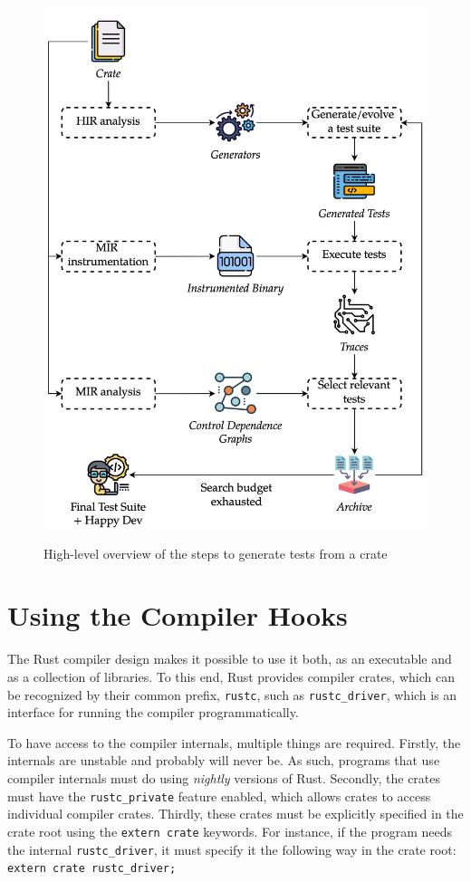 \documentclass[paper=a4,%
  twoside,%
  BCOR4mm,%
  abstract=true,%
  toc=bibliography,%
  chapterprefix=true,%
  toc=bibliographynumbered,%
  open=right,%
  english,%
  pagesize=pdftex]{scrreprt}
\begin{document}
\begin{figure}[h!]
\caption{High-level overview of the steps to generate tests from a crate}
\centering
\includegraphics[width=\textwidth]{overview/overview-enhanced}
\label{fig:rustyunit-overview}
\end{figure}

\section{Using the Compiler Hooks}
The Rust compiler design makes it possible to use it both, as an executable and as a collection of libraries. To this end, Rust provides compiler crates, which can be recognized by their common prefix, \texttt{rustc}, such as \texttt{rustc\string_driver}, which is an interface for running the compiler programmatically.

To have access to the compiler internals, multiple things are required. Firstly, the internals are unstable and probably will never be. As such, programs that use compiler internals must do using \textit{nightly} versions of Rust. Secondly, the crates must have the \texttt{rustc\string_private} feature enabled, which allows crates to access individual compiler crates. Thirdly, these crates must be explicitly specified in the crate root using the \texttt{extern crate} keywords. For instance, if the program needs the internal \texttt{rustc\string_driver}, it must specify it the following way in the crate root: \texttt{extern crate rustc\string_driver;}
\end{document}
